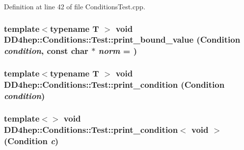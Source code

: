 Definition at line 42 of file ConditionsTest.cpp.\hypertarget{namespace_d_d4hep_1_1_conditions_1_1_test_a340ecdd15aa8418ed34b456de54cdcdf}{
\subsubsection[{print\_\-bound\_\-value}]{\setlength{\rightskip}{0pt plus 5cm}template$<$typename T $>$ void DD4hep::Conditions::Test::print\_\-bound\_\-value (Condition {\em condition}, \/  const char $\ast$ {\em norm} = {})}}
\label{namespace_d_d4hep_1_1_conditions_1_1_test_a340ecdd15aa8418ed34b456de54cdcdf}
\hypertarget{namespace_d_d4hep_1_1_conditions_1_1_test_a366e32be71ba92be577b9a2b6b7a9807}{
\subsubsection[{print\_\-condition}]{\setlength{\rightskip}{0pt plus 5cm}template$<$typename T $>$ void DD4hep::Conditions::Test::print\_\-condition (Condition {\em condition})}}
\label{namespace_d_d4hep_1_1_conditions_1_1_test_a366e32be71ba92be577b9a2b6b7a9807}
\hypertarget{namespace_d_d4hep_1_1_conditions_1_1_test_a98d5ba8b5cefdbb09afa9ee6bbe513f4}{
\subsubsection[{print\_\-condition$<$ void $>$}]{\setlength{\rightskip}{0pt plus 5cm}template$<$$>$ void DD4hep::Conditions::Test::print\_\-condition$<$ void $>$ ({\bf Condition} {\em c})}}
\label{namespace_d_d4hep_1_1_conditions_1_1_test_a98d5ba8b5cefdbb09afa9ee6bbe513f4}



